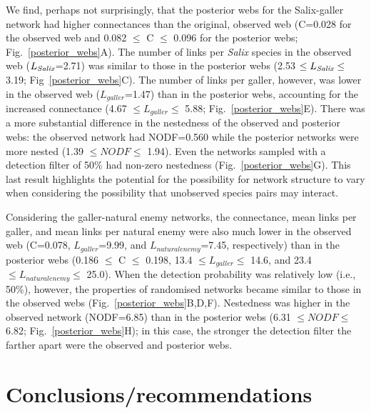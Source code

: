 \documentclass[12pt]{article}
\begin{document}
\begin{spacing}{2.0}
    We find, perhaps not surprisingly, that the posterior webs for the Salix-galler network  had higher connectances than the original, observed web (C=0.028 for the observed web and 0.082 $\leq$ C $\leq$ 0.096 for the posterior webs; Fig.~\ref{posterior_webs}A). The number of links per \emph{Salix} species in the observed web ($L_{\emph{Salix}}$=2.71) was similar to those in the posterior webs (2.53 $\leq L_{\emph{Salix}} \leq$ 3.19; Fig~\ref{posterior_webs}C). The number of links per galler, however, was lower in the observed web ($L_{galler}$=1.47) than in the posterior webs, accounting for the increased connectance (4.67 $\leq L_{galler} \leq$ 5.88; Fig.~\ref{posterior_webs}E). There was a more substantial difference in the nestedness of the observed and posterior webs: the observed network had NODF=0.560 while the posterior networks were more nested (1.39 $\leq NODF \leq$ 1.94). Even the networks sampled with a detection filter of 50\% had non-zero nestedness (Fig.~\ref{posterior_webs}G). This last result highlights the potential for the possibility for network structure to vary when considering the possibility that unobserved species pairs may interact.


    Considering the galler-natural enemy networks, the connectance, mean links per galler, and mean links per natural enemy were also much lower in the observed web (C=0.078, $L_{galler}$=9.99, and $L_{natural enemy}$=7.45, respectively) than in the posterior webs (0.186 $\leq$ C $\leq$ 0.198, 13.4 $\leq L_{galler} \leq$ 14.6, and 23.4 $\leq L_{natural enemy} \leq$ 25.0). When the detection probability was relatively low (i.e., 50\%), however, the properties of randomised networks became similar to those in the observed webs (Fig.~\ref{posterior_webs}B,D,F). Nestedness was higher in the observed network (NODF=6.85) than in the posterior webs (6.31 $\leq NODF \leq$ 6.82; Fig.~\ref{posterior_webs}H); in this case, the stronger the detection filter the farther apart were the observed and posterior webs. 


\section*{Conclusions/recommendations}


\end{spacing}
\end{document}
